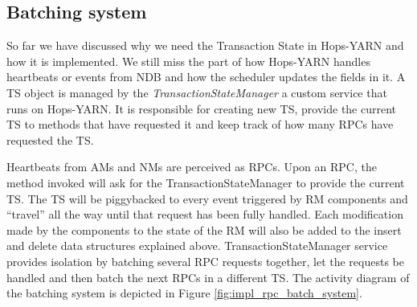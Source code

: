 \subsection{Batching system}
\label{ssec:impl_batch_system}
So far we have discussed why we need the Transaction State in
Hops-YARN and how it is implemented. We still miss the part of how
Hops-YARN handles heartbeats or events from NDB and how the scheduler
updates the fields in it. A TS object is managed by the
\emph{TransactionStateManager} a custom service that runs on Hops-YARN.
It is responsible for creating new TS, provide the
current TS to methods that have requested it and keep track of how many
RPCs have requested the TS.

Heartbeats from AMs and NMs are perceived as
RPCs. Upon an RPC, the method invoked will ask for the TransactionStateManager
to provide the current TS. The TS will be piggybacked to every event
triggered by RM components and ``travel'' all the way until that
request has been fully handled. Each modification made by the components
to the state of the RM will also be added to the insert and delete
data structures explained above. TransactionStateManager service
provides isolation by batching several RPC requests together, let the
requests be handled and then batch the next RPCs in a different
TS. The activity diagram of the batching system is depicted in Figure
\ref{fig:impl_rpc_batch_system}.

